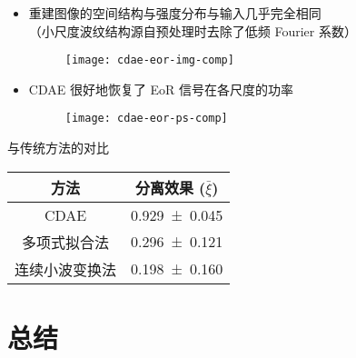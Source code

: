 \documentclass{beamer}
\begin{document}
\begin{frame}
  \vspace{1ex}
  \begin{itemize}
    \item 重建图像的空间结构与强度分布与输入几乎完全相同 \\
      （小尺度波纹结构源自预处理时去除了低频 Fourier 系数）
      \begin{figure}
      \centering
      \texttt{[image: cdae-eor-img-comp]}
      \end{figure}
    \item CDAE 很好地恢复了 EoR 信号在各尺度的功率
      \begin{figure}
      \centering
      \texttt{[image: cdae-eor-ps-comp]}
      \end{figure}
  \end{itemize}
\end{frame}

\begin{frame}[t]
  \begin{alertblock}{与传统方法的对比}
  \end{alertblock}
  \begin{table}
    \centering
    \begin{tabular}{cc}
      \toprule
      方法 & 分离效果 ($\bar{\xi}$) \\
      \midrule
      CDAE & \num{0.929 +- 0.045} \\
      \midrule
      多项式拟合法 & \num{0.296 +- 0.121} \\
      连续小波变换法 & \num{0.198 +- 0.160} \\
      \bottomrule
    \end{tabular}
  \end{table}
\end{frame}


\section{总结}
\end{document}
